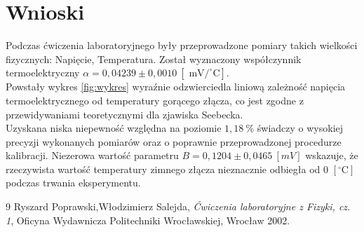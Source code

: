 \documentclass{article}
\begin{document}
\section{Wnioski}
\label{wnioski}
Podczas ćwiczenia laboratoryjnego były przeprowadzone pomiary takich wielkości fizycznych: Napięcie, Temperatura. Został wyznaczony współczynnik termoelektryczny \(\alpha = 0,04239 \pm 0,0010 \ [\text{ mV}/^\circ\text{C}]\). \\

Powstały wykres \cref{fig:wykres} wyraźnie odzwierciedla liniową zależność napięcia termoelektrycznego od temperatury gorącego złącza, co jest zgodne z przewidywaniami teoretycznymi dla zjawiska Seebecka. \\ 

Uzyskana niska niepewność względna na poziomie \(1,18 \ \%\) świadczy o wysokiej precyzji wykonanych pomiarów oraz o poprawnie przeprowadzonej procedurze kalibracji. Niezerowa wartość parametru \(B = 0,1204 \pm  0,0465 \ [mV]\) wskazuje, że rzeczywista wartość temperatury zimnego złącza nieznacznie odbiegła od 0 $[^\circ\text{C}]$ podczas trwania eksperymentu.
\vfill
\normalsize
{}
\begin{thebibliography}{9}
    Ryszard Poprawski,Włodzimierz Salejda, \textit{Ćwiczenia laboratoryjne z Fizyki, cz. 1}, Oficyna Wydawnicza Politechniki Wrocławskiej, Wrocław 2002.
    
\end{thebibliography}
\end{document}
